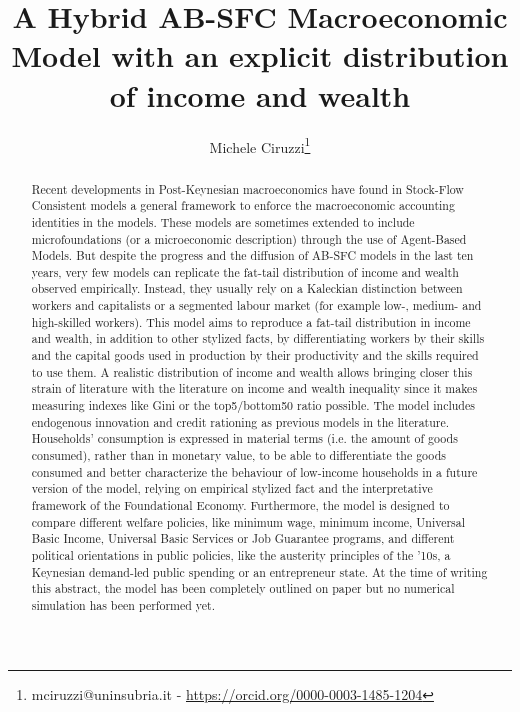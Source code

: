 \documentclass[a4paper, headings=standardclasses]{scrartcl}
\title{A Hybrid AB-SFC Macroeconomic Model with an explicit distribution of income and wealth \let\thefootnote\relax\footnotetext{
	This version is intended to be submitted as a working paper to the 2023 PKES PhD Conference.

	An updated version of this paper and all the source code and the instructions required to replicate the paper will be available at \url{https://github.com/TnTo/FE/}
  }}
\author{Michele Ciruzzi\thanks{mciruzzi@uninsubria.it - \url{https://orcid.org/0000-0003-1485-1204}}}
\begin{document}
\maketitle

\begin{abstract}
	Recent developments in Post-Keynesian macroeconomics have found in Stock-Flow Consistent models a general framework to enforce the macroeconomic accounting identities in the models.
	These models are sometimes extended to include microfoundations (or a microeconomic description) through the use of Agent-Based Models.
	But despite the progress and the diffusion of AB-SFC models in the last ten years, very few models can replicate the fat-tail distribution of income and wealth observed empirically.
	Instead, they usually rely on a Kaleckian distinction between workers and capitalists or a segmented labour market (for example low-, medium- and high-skilled workers).
	This model aims to reproduce a fat-tail distribution in income and wealth, in addition to other stylized facts, by differentiating workers by their skills and the capital goods used in production by their productivity and the skills required to use them.
	A realistic distribution of income and wealth allows bringing closer this strain of literature with the literature on income and wealth inequality since it makes measuring indexes like Gini or the top5/bottom50 ratio possible.
	The model includes endogenous innovation and credit rationing as previous models in the literature.
	Households' consumption is expressed in material terms (i.e. the amount of goods consumed), rather than in monetary value, to be able to differentiate the goods consumed and better characterize the behaviour of low-income households in a future version of the model, relying on empirical stylized fact and the interpretative framework of the Foundational Economy.
	Furthermore, the model is designed to compare different welfare policies, like minimum wage, minimum income, Universal Basic Income, Universal Basic Services or Job Guarantee programs, and different political orientations in public policies, like the austerity principles of the '10s, a Keynesian demand-led public spending or an entrepreneur state.
	At the time of writing this abstract, the model has been completely outlined on paper but no numerical simulation has been performed yet.
\end{abstract}
\end{document}
